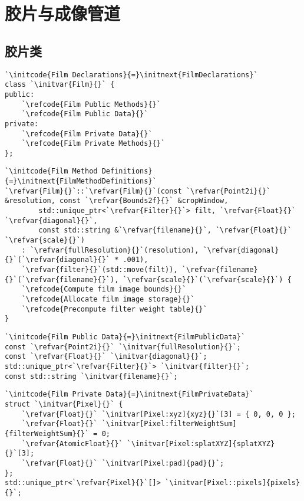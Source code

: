 \section{胶片与成像管道}\label{sec:胶片与成像管道}

\subsection{胶片类}\label{sub:胶片类}

\begin{lstlisting}
`\initcode{Film Declarations}{=}\initnext{FilmDeclarations}`
class `\initvar{Film}{}` {
public:
    `\refcode{Film Public Methods}{}`
    `\refcode{Film Public Data}{}`
private:
    `\refcode{Film Private Data}{}`
    `\refcode{Film Private Methods}{}`
};
\end{lstlisting}

\begin{lstlisting}
`\initcode{Film Method Definitions}{=}\initnext{FilmMethodDefinitions}`
`\refvar{Film}{}`::`\refvar{Film}{}`(const `\refvar{Point2i}{}` &resolution, const `\refvar{Bounds2f}{}` &cropWindow,
        std::unique_ptr<`\refvar{Filter}{}`> filt, `\refvar{Float}{}` `\refvar{diagonal}{}`,
        const std::string &`\refvar{filename}{}`, `\refvar{Float}{}` `\refvar{scale}{}`)
    : `\refvar{fullResolution}{}`(resolution), `\refvar{diagonal}{}`(`\refvar{diagonal}{}` * .001),
    `\refvar{filter}{}`(std::move(filt)), `\refvar{filename}{}`(`\refvar{filename}{}`), `\refvar{scale}{}`(`\refvar{scale}{}`) {
    `\refcode{Compute film image bounds}{}`
    `\refcode{Allocate film image storage}{}`
    `\refcode{Precompute filter weight table}{}`
}
\end{lstlisting}

\begin{lstlisting}
`\initcode{Film Public Data}{=}\initnext{FilmPublicData}`
const `\refvar{Point2i}{}` `\initvar{fullResolution}{}`;
const `\refvar{Float}{}` `\initvar{diagonal}{}`;
std::unique_ptr<`\refvar{Filter}{}`> `\initvar{filter}{}`;
const std::string `\initvar{filename}{}`;
\end{lstlisting}

\begin{lstlisting}
`\initcode{Film Private Data}{=}\initnext{FilmPrivateData}`
struct `\initvar{Pixel}{}` {
    `\refvar{Float}{}` `\initvar[Pixel:xyz]{xyz}{}`[3] = { 0, 0, 0 };
    `\refvar{Float}{}` `\initvar[Pixel:filterWeightSum]{filterWeightSum}{}` = 0;
    `\refvar{AtomicFloat}{}` `\initvar[Pixel:splatXYZ]{splatXYZ}{}`[3];
    `\refvar{Float}{}` `\initvar[Pixel:pad]{pad}{}`;
};
std::unique_ptr<`\refvar{Pixel}{}`[]> `\initvar[Pixel::pixels]{pixels}{}`;
\end{lstlisting}

